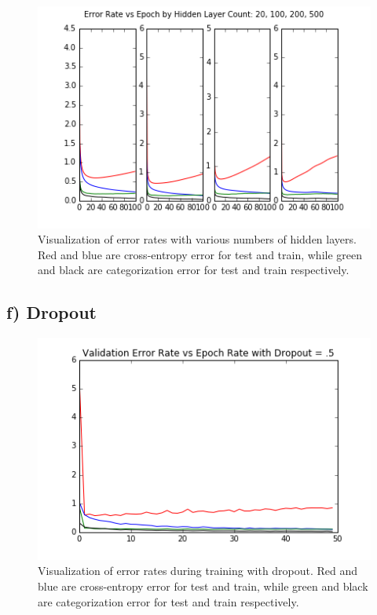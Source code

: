 \documentclass{article}
\begin{document}
\begin{figure}[h]
  \centering
  \includegraphics[scale=0.6]{../hidden_units.png} 
  \caption{Visualization of error rates with various numbers of hidden layers. Red and blue are cross-entropy error for test and train, while green and black are categorization error for test and train respectively. }
  \label{fig:hiddenunits}
\end{figure}

\subsection{f) Dropout}



\begin{figure}[h]
  \centering
  \includegraphics[scale=0.6]{../dropout1.png} 
  \caption{Visualization of error rates during training with dropout. Red and blue are cross-entropy error for test and train, while green and black are categorization error for test and train respectively. }
  \label{fig:momentumsrate1}
\end{figure}
\end{document}
